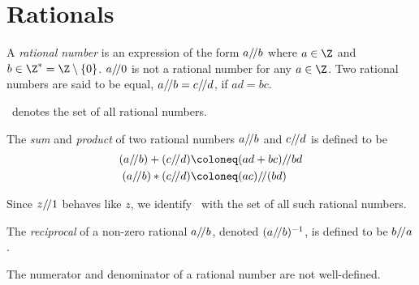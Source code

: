 \section{Rationals} \label{sec:Q}
\begin{definition*}
    A \emph{rational number} is an expression of the form $a /\!/ b$
    where $a \in \Z$ and $b \in \Z^* = \Z \setminus \{0\}$.
    $a /\!/ 0$ is not a rational number for any $a \in \Z$.
    Two rational numbers are said to be equal,
    $a /\!/ b = c /\!/ d$, if $ad = bc$.

    \Q\ denotes the set of all rational numbers.
\end{definition*}

\begin{definition}
    The \emph{sum} and \emph{product} of two rational numbers
    $a /\!/ b$ and $c /\!/ d$ is defined to be
    \begin{align*}
        (a \doubleslash b) + (c \doubleslash d)
            &\coloneq (ad + bc) \doubleslash bd \\
        (a \doubleslash b) * (c \doubleslash d)
            &\coloneq (ac) \doubleslash (bd)
    \end{align*}
\end{definition}

Since $z /\!/ 1$ behaves like $z$, we identify \Z\ with the set of
all such rational numbers.

\begin{definition}
    The \emph{reciprocal} of a non-zero rational $a /\!/ b$, denoted
    $(a /\!/ b)^{-1}$, is defined to be $b /\!/ a$.
\end{definition}
\begin{remark}
    The numerator and denominator of a rational number are not well-defined.
\end{remark}

